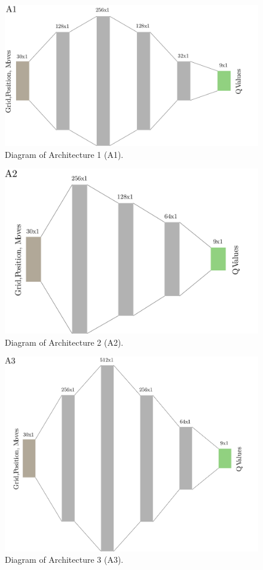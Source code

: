\documentclass[
  openany]{book}
\begin{document}
\begin{figure}

{\centering \includegraphics[width=0.8\linewidth]{pics/A1} 

}

\caption{Diagram of Architecture 1 (A1).}\label{fig:A1}
\end{figure}



\begin{figure}

{\centering \includegraphics[width=0.8\linewidth]{pics/A2} 

}

\caption{Diagram of Architecture 2 (A2).}\label{fig:A2}
\end{figure}



\begin{figure}

{\centering \includegraphics[width=0.8\linewidth]{pics/A3} 

}

\caption{Diagram of Architecture 3 (A3).}\label{fig:A3}
\end{figure}
\end{document}
